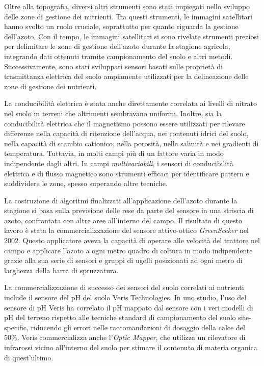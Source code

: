 Oltre alla topografia, diversi altri strumenti sono stati impiegati nello sviluppo delle zone di gestione dei nutrienti. Tra questi strumenti, le immagini satellitari hanno svolto un ruolo cruciale, soprattutto per quanto riguarda la gestione dell'azoto. Con il tempo, le immagini satellitari si sono rivelate strumenti preziosi per delimitare le zone di gestione dell'azoto durante la stagione agricola, integrando dati ottenuti tramite campionamento del suolo e altri metodi. Successivamente, sono stati sviluppati sensori basati sulle proprietà di trasmittanza elettrica del suolo ampiamente utilizzati per la delineazione delle zone di gestione dei nutrienti.

La conducibilità elettrica è stata anche direttamente correlata ai livelli di nitrato nel suolo in terreni che altrimenti sembravano uniformi. Inoltre, sia la conducibilità elettrica che il magnetismo possono essere utilizzati per rilevare differenze nella capacità di ritenzione dell'acqua, nei contenuti idrici del suolo, nella capacità di scambio cationico, nella porosità, nella salinità e nei gradienti di temperatura.
Tuttavia, in molti campi più di un fattore varia in modo indipendente dagli altri. In campi \textit{multivariabili}, i sensori di conducibilità elettrica e di flusso magnetico sono strumenti efficaci per identificare pattern e suddividere le zone, spesso superando altre tecniche.

La costruzione di algoritmi finalizzati all'applicazione dell'azoto durante la stagione si basa sulla previsione delle rese da parte del sensore in una striscia di azoto, confrontata con altre aree all'interno del campo. Il risultato di questo lavoro è stata la commercializzazione del sensore attivo-ottico \textit{GreenSeeker} nel 2002. Questo applicatore aveva la capacità di operare alle velocità del trattore nel campo e applicare l'azoto a ogni metro quadro di coltura in modo indipendente grazie alla sua serie di sensori e gruppi di ugelli posizionati ad ogni metro di larghezza della barra di spruzzatura.

La commercializzazione di successo dei sensori del suolo correlati ai nutrienti include il sensore del pH del suolo Veris Technologies. In uno studio, l'uso del sensore di pH Veris ha correlato il pH mappato dal sensore con i veri modelli di pH del terreno rispetto alle tecniche standard di campionamento del suolo site-specific, riducendo gli errori nelle raccomandazioni di dosaggio della calce del 50\%. Veris commercializza anche l'\textit{Optic Mapper}, che utilizza un rilevatore di infrarossi vicino all'interno del suolo per stimare il contenuto di materia organica di quest'ultimo.

